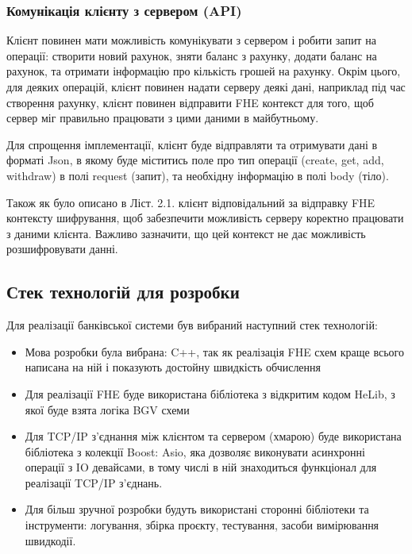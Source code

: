 \subsubsection*{Комунікація клієнту з сервером (API)}
Клієнт повинен мати можливість комунікувати з сервером і робити запит на операції: створити
новий рахунок, зняти баланс з рахунку, додати баланс на рахунок, та отримати інформацію
про кількість грошей на рахунку. Окрім цього, для деяких операцій, клієнт повинен надати
серверу деякі дані, наприклад під час створення рахунку, клієнт повинен відправити FHE контекст
для того, щоб сервер міг правильно працювати з цими даними в майбутньому.

Для спрощення імплементації, клієнт буде відправляти та отримувати дані в форматі Json, в
якому буде міститись поле про тип операції (create, get, add, withdraw) в полі 
request (запит), та необхідну інформацію в полі body (тіло).

Також як було описано в Ліст. 2.1. клієнт відповідальний за відправку FHE контексту шифрування,
щоб забезпечити можливість серверу коректно працювати з даними клієнта. Важливо зазначити, що
цей контекст не дає можливість розшифровувати данні.

\subsection{Стек технологій для розробки}
Для реалізації банківської системи був вибраний наступний стек технологій:
\begin{itemize}

    \item{Мова розробки була вибрана: C++, так як реалізація FHE схем краще всього написана
на ній і показують достойну швидкість обчислення}
    \item{Для реалізації FHE буде використана бібліотека з відкритим кодом HeLib, з
якої буде взята логіка BGV схеми}
    \item{Для TCP/IP з'єднання між клієнтом та сервером (хмарою) буде використана бібліотека
з колекції Boost: Asio, яка дозволяє виконувати асинхронні операції з IO девайсами, в тому
числі в ній знаходиться функціонал для реалізації TCP/IP з'єднань.}
    \item{Для більш зручної розробки будуть використані сторонні бібліотеки та інструменти:
логування, збірка проєкту, тестування, засоби вимірювання швидкодії.}
\end{itemize}


